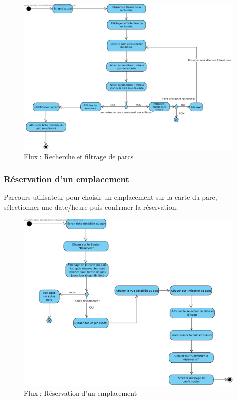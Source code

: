 \documentclass[12pt,a4paper]{article}
\begin{document}
\begin{figure}[H]
  \centering
  \includegraphics[width=0.9\linewidth]{attachments/Recherche_Filtrage_Parcs.pdf}
  \caption{Flux : Recherche et filtrage de parcs}
\end{figure}

\subsubsection{Réservation d'un emplacement}

Parcours utilisateur pour choisir un emplacement sur la carte du parc, sélectionner une date/heure puis confirmer la réservation.

\begin{figure}[H]
  \centering
  \includegraphics[width=0.9\linewidth]{attachments/Reservation_d_un_emplacement.pdf}
  \caption{Flux : Réservation d'un emplacement}
\end{figure}
\end{document}
